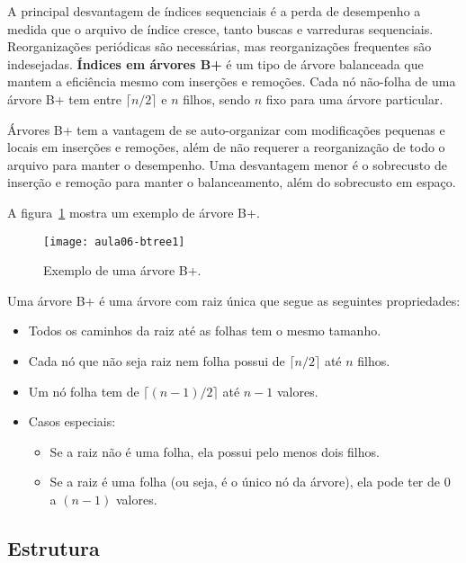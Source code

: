 A principal desvantagem de índices sequenciais é a perda de desempenho
a medida que o arquivo de índice cresce, tanto buscas e varreduras sequenciais.
Reorganizações periódicas são necessárias, mas reorganizações frequentes
são indesejadas.
\textbf{Índices em árvores B+} é um tipo de árvore balanceada que mantem a eficiência
mesmo com inserções e remoções.
Cada nó não-folha de uma árvore B+ tem entre $\lceil n/2 \rceil$ e $n$ filhos,
sendo $n$ fixo para uma árvore particular.

Árvores B+ tem a vantagem de se auto-organizar com modificações pequenas e
locais em inserções e remoções, além de não requerer a reorganização de todo o
arquivo para manter o desempenho.
Uma desvantagem menor é o sobrecusto de inserção e remoção para manter o 
balanceamento, além do sobrecusto em espaço.

A figura~\ref{aula06:fig:btree1} mostra um exemplo de árvore B+.
%
\begin{figure}[!htb]
\centering
\texttt{[image: aula06-btree1]}
\caption{Exemplo de uma árvore B+.}
\label{aula06:fig:btree1}
\end{figure}

Uma árvore B+ é uma árvore com raiz única que segue as seguintes propriedades:
\begin{itemize}
\item Todos os caminhos da raiz até as folhas tem o mesmo tamanho.
\item Cada nó que não seja raiz nem folha possui de $\lceil n/2 \rceil$
até $n$ filhos.
\item Um nó folha tem de $\lceil (n-1)/2 \rceil$ até $n-1$ valores.
\item Casos especiais:
	\begin{itemize}
	\item Se a raiz não é uma folha, ela possui pelo menos dois filhos.
	\item Se a raiz é uma folha (ou seja, é o único nó da árvore), ela
	pode ter de $0$ a $(n-1)$ valores.
	\end{itemize}
\end{itemize}

\subsection{Estrutura}

